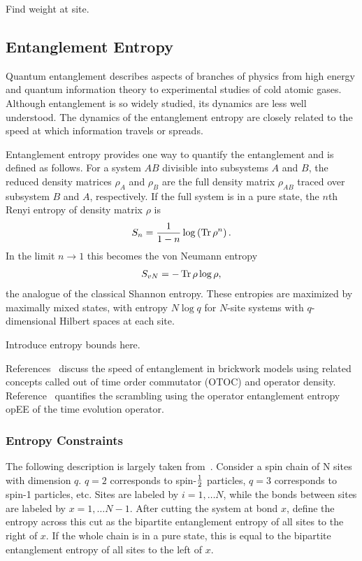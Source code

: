 Find weight at site.

\subsection{Entanglement Entropy} \label{sub:intro}

Quantum entanglement describes aspects of branches of physics from high energy and quantum information theory to experimental studies of cold atomic gases. Although entanglement is so widely studied, its dynamics are less well understood. The dynamics of the entanglement entropy are closely related to the speed at which information travels or spreads. 

Entanglement entropy provides one way to quantify the entanglement and is defined as follows. For a system $AB$ divisible into subsystems $A$ and $B$, the reduced density matrices $\rho_A$ and $\rho_B$ are the full density matrix $\rho_{AB}$ traced over subsystem $B$ and $A$, respectively. If the full system is in a pure state, the $n$th Renyi entropy of density matrix $\rho$ is 
\begin{align}
S_n = \frac{1}{1-n}\log\left(\operatorname{Tr}\rho^n\right). \label{eqn:renyi}
\end{align}
In the limit $n\to1$ this becomes the von Neumann entropy
\begin{align}
S_{vN} = -\operatorname{Tr}\rho\log\rho,
\end{align}
the analogue of the classical Shannon entropy. These entropies are maximized by maximally mixed states, with entropy $N\log q$ for $N$-site systems with $q$-dimensional Hilbert spaces at each site.

Introduce entropy bounds here.

References~\cite{Keyserlingk, Jonay} discuss the speed of entanglement in brickwork models using related concepts called out of time order commutator (OTOC) and operator density. Reference~\cite{Zhou2017} quantifies the scrambling using the operator entanglement entropy opEE of the time evolution operator.

\subsubsection{Entropy Constraints} \label{subsub:constraints}

The following description is largely taken from~\cite{Nahum2017}. Consider a spin chain of N sites with dimension $q$. $q=2$ corresponds to spin-$\frac{1}{2}$ particles, $q=3$ corresponds to spin-1 particles, etc. Sites are labeled by $i=1,\dots N$, while the bonds between sites are labeled by $x = 1,\dots N-1$. After cutting the system at bond $x$, define the entropy across this cut as the bipartite entanglement entropy of all sites to the right of $x$. If the whole chain is in a pure state, this is equal to the bipartite entanglement entropy of all sites to the left of $x$.

